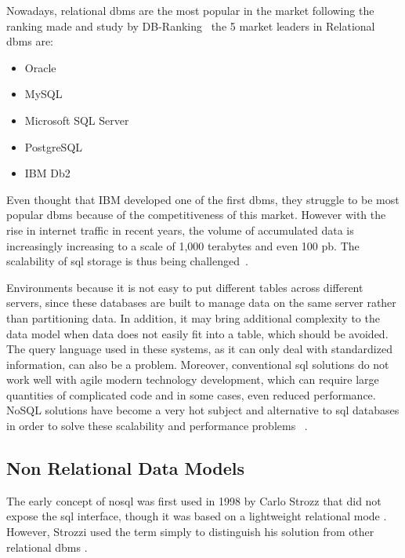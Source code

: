 Nowadays, relational \gls{dbms} are the most popular in the market following the ranking made and study by DB-Ranking~\cite{DBR} the 5 market leaders in Relational \gls{dbms} are:

\begin{itemize}
    \item Oracle
    \item MySQL
    \item Microsoft SQL Server
    \item PostgreSQL
    \item IBM Db2
\end{itemize}

Even thought that IBM developed one of the first \gls{dbms}, they struggle to be most popular \gls{dbms} because of the competitiveness of this market. However with the rise in internet traffic in recent years, the volume of accumulated data is increasingly increasing to a scale of 1,000 terabytes and even 100 \gls{pb}. The scalability of \gls{sql} storage is thus being challenged~\cite{wuoverview}.

Environments because it is not easy to put different tables across different servers, since these databases are built to manage data on the same server rather than partitioning data. In addition, it may bring additional complexity to the data model when data does not easily fit into a table, which should be avoided. The query language used in these systems, as it can only deal with standardized information, can also be a problem. Moreover, conventional \gls{sql} solutions do not work well with agile modern technology development, which can require large quantities of complicated code and in some cases, even reduced performance. NoSQL solutions have become a very hot subject and alternative to \gls{sql} databases in order to solve these scalability and performance problems ~\cite{han2011survey,wuoverview}.

\subsection{Non Relational Data Models}

The early concept of \gls{nosql} was first used in 1998 by Carlo Strozz \cite{NoSQLRel28:online} that did not expose the \gls{sql} interface, though it was based on a lightweight relational mode \cite{breiefreview,nosqlchoose,wuoverview}. However, Strozzi used the term simply to distinguish his solution from other relational \gls{dbms} \cite{nosqlchoose}.

